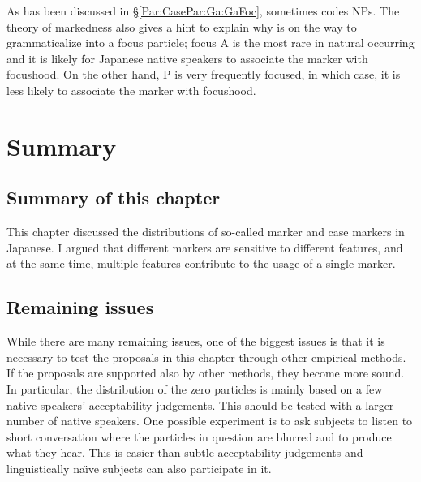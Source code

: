 As has been discussed in \S \ref{Par:CasePar:Ga:GaFoc},
 sometimes codes  NPs.
The theory of markedness also gives a hint to explain why  is on the way to grammaticalize into a focus particle;
focus A is the most rare in natural occurring 
and it is likely for Japanese native speakers to associate the marker  with focushood.
On the other hand, P is very frequently focused,
in which case, it is less likely to associate the marker  with focushood.




\section{Summary}

\subsection{Summary of this chapter}

This chapter discussed the distributions of so-called  marker and case markers in Japanese.
I argued that
different markers are sensitive to different features, and
at the same time,
 multiple features contribute to the usage of a single marker.


\subsection{Remaining issues}

While there are many remaining issues,
one of the biggest issues is that
it is necessary to test the proposals in this chapter through other empirical methods.
If the proposals are supported also by other methods,
they become more sound.
In particular, the distribution of the zero particles is mainly based on a few native speakers' acceptability judgements.
This should be tested with a larger number of native speakers.
One possible experiment is to ask subjects to listen to short conversation where the particles in question are blurred
and to produce what they hear.
This is easier than subtle acceptability judgements and linguistically na\"{\i}ve subjects can also participate in it.

